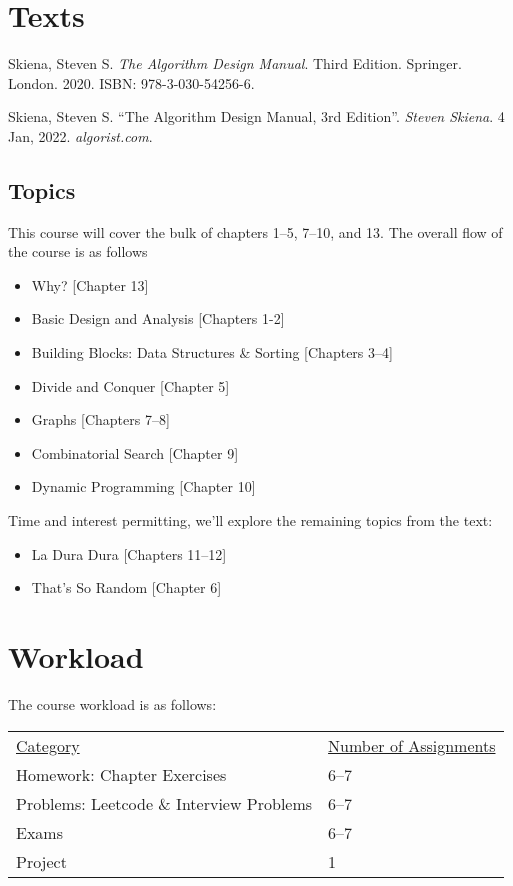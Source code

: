 \documentclass[10pt]{article}
\begin{document}
\section{Texts}

Skiena, Steven S. \textit{The Algorithm Design Manual}. Third Edition. Springer. London. 2020.
\newline ISBN: 978-3-030-54256-6.
\vspace{.1in}

\noindent
Skiena, Steven S. ``The Algorithm Design Manual, 3rd Edition''. \textit{Steven Skiena}. 4 Jan, 2022. \textit{algorist.com}.



\subsection{Topics}

This course will cover the bulk of chapters 1--5, 7--10, and 13. The overall flow of the course is as follows
\begin{itemize}
\item Why? [Chapter 13]
\item Basic Design and Analysis [Chapters 1-2]
\item Building Blocks: Data Structures \& Sorting [Chapters 3--4]
\item Divide and Conquer [Chapter 5]
\item Graphs [Chapters 7--8]
\item Combinatorial Search [Chapter 9]
\item Dynamic Programming [Chapter 10]
\end{itemize}

Time and interest permitting, we'll explore the remaining topics from the text:
\begin{itemize}
  \item La Dura Dura [Chapters 11--12]
  \item That's So Random [Chapter 6]
\end{itemize}

\section{Workload}

The course workload is as follows:
\begin{center}
  \begin{tabular}{ll}
    \underline{Category} & \underline{Number of Assignments} \\
     Homework: Chapter Exercises & 6--7 \\
     Problems: Leetcode \& Interview Problems & 6--7 \\
     Exams & 6--7 \\
     Project & 1 \\
   \end{tabular}
 \end{center}
\end{document}

